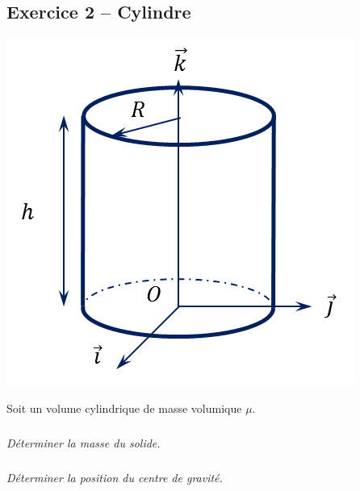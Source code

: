 \documentclass[10pt]{article}
\begin{document}
\subsection*{Exercice 2 -- Cylindre}
\setcounter{subparagraph}{0}
\begin{minipage}[c]{.3\linewidth}
\begin{center}
\includegraphics[width=.95\textwidth]{images/cylindre}
\end{center}
\end{minipage} \hfill
\begin{minipage}[c]{.65\linewidth}
Soit un volume cylindrique de masse volumique $\mu$.
\subparagraph{}
\textit{Déterminer la masse du solide.}
\subparagraph{}
\textit{Déterminer la position du centre de gravité.}
\end{minipage}

\end{document}
